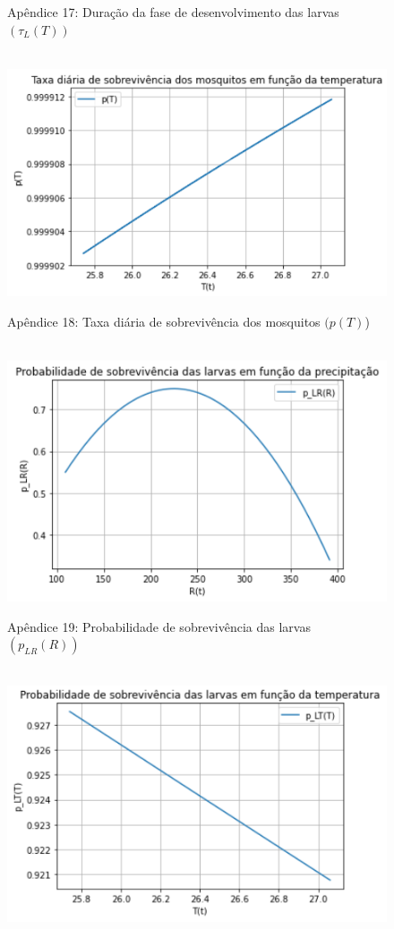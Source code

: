 \documentclass[
	12pt,				%
	oneside,			%
	a4paper,			%
	english,			%
	brazil				%
	]{abntex2}
\begin{document}
\begin{apendicesenv}
\begin{figure}[!ht]
	\caption*{Apêndice 17: Duração da fase de desenvolvimento das larvas $(\tau_L(T))$} 
\end{figure} 
\begin{figure}[!ht]
	\centering
	\hbox{\hspace{2.5em} \includegraphics[scale=1.0] {Plot_p(T).png}}
	\caption*{Apêndice 18: Taxa diária de sobrevivência dos mosquitos $(p(T)$)} 
\end{figure} 
\newpage
\begin{figure}[!ht]
	\centering
	\hbox{\hspace{3.0em} \includegraphics[scale=1.0] {Plot_p_LR(R).png}}
	\caption*{Apêndice 19: Probabilidade de sobrevivência das larvas $(p_{LR}(R))$} 
\end{figure} 
\begin{figure}[!ht]
	\centering
	\hbox{\hspace{2.5em} \includegraphics[scale=1.0] {Plot_p_LT(T)_corrigido.png}}

\end{figure}
\end{apendicesenv}
\end{document}
